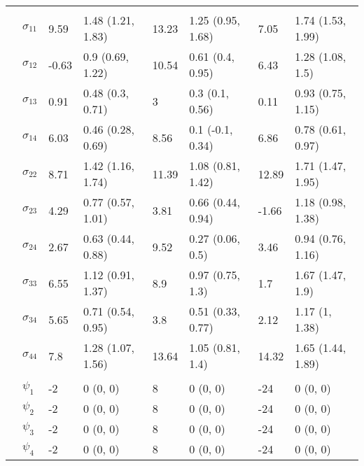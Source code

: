 \documentclass[]{article}
\begin{document}
\begin{table}[t]
\begin{tabular}{llllllll}
\addlinespace[0.3em]
\multicolumn{8}{l}{\textbf{ }}\\
\hspace{1em} & $\sigma_{11}$ & 9.59 & 1.48 (1.21, 1.83) & 13.23 & 1.25 (0.95, 1.68) & 7.05 & 1.74 (1.53, 1.99)\\
\hspace{1em} & $\sigma_{12}$ & -0.63 & 0.9 (0.69, 1.22) & 10.54 & 0.61 (0.4, 0.95) & 6.43 & 1.28 (1.08, 1.5)\\
\hspace{1em} & $\sigma_{13}$ & 0.91 & 0.48 (0.3, 0.71) & 3 & 0.3 (0.1, 0.56) & 0.11 & 0.93 (0.75, 1.15)\\
\hspace{1em} & $\sigma_{14}$ & 6.03 & 0.46 (0.28, 0.69) & 8.56 & 0.1 (-0.1, 0.34) & 6.86 & 0.78 (0.61, 0.97)\\
\hspace{1em} & $\sigma_{22}$ & 8.71 & 1.42 (1.16, 1.74) & 11.39 & 1.08 (0.81, 1.42) & 12.89 & 1.71 (1.47, 1.95)\\
\hspace{1em} & $\sigma_{23}$ & 4.29 & 0.77 (0.57, 1.01) & 3.81 & 0.66 (0.44, 0.94) & -1.66 & 1.18 (0.98, 1.38)\\
\hspace{1em} & $\sigma_{24}$ & 2.67 & 0.63 (0.44, 0.88) & 9.52 & 0.27 (0.06, 0.5) & 3.46 & 0.94 (0.76, 1.16)\\
\hspace{1em} & $\sigma_{33}$ & 6.55 & 1.12 (0.91, 1.37) & 8.9 & 0.97 (0.75, 1.3) & 1.7 & 1.67 (1.47, 1.9)\\
\hspace{1em} & $\sigma_{34}$ & 5.65 & 0.71 (0.54, 0.95) & 3.8 & 0.51 (0.33, 0.77) & 2.12 & 1.17 (1, 1.38)\\
\hspace{1em} & $\sigma_{44}$ & 7.8 & 1.28 (1.07, 1.56) & 13.64 & 1.05 (0.81, 1.4) & 14.32 & 1.65 (1.44, 1.89)\\
\addlinespace[0.3em]
\multicolumn{8}{l}{\textbf{ }}\\
\hspace{1em} & $\psi_{1}$ & -2 & 0 (0, 0) & 8 & 0 (0, 0) & -24 & 0 (0, 0)\\
\hspace{1em} & $\psi_{2}$ & -2 & 0 (0, 0) & 8 & 0 (0, 0) & -24 & 0 (0, 0)\\
\hspace{1em} & $\psi_{3}$ & -2 & 0 (0, 0) & 8 & 0 (0, 0) & -24 & 0 (0, 0)\\
\hspace{1em} & $\psi_{4}$ & -2 & 0 (0, 0) & 8 & 0 (0, 0) & -24 & 0 (0, 0)\\

\end{tabular}
\end{table}
\end{document}
